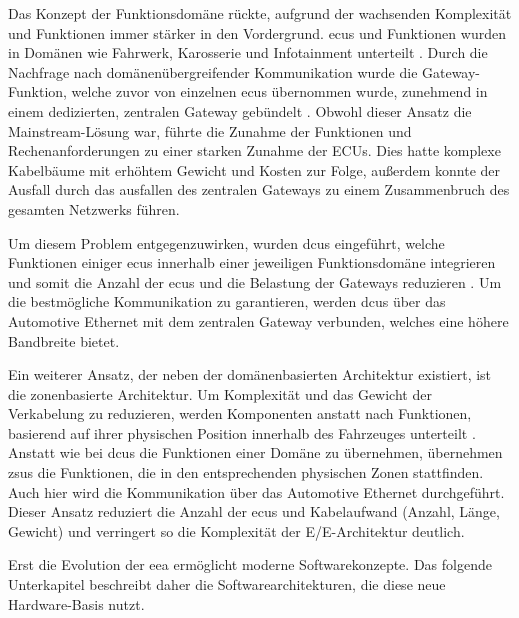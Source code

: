 Das Konzept der Funktionsdomäne rückte, aufgrund der wachsenden Komplexität und Funktionen immer stärker in den Vordergrund. \glspl{ecu} und Funktionen wurden in Domänen wie Fahrwerk, Karosserie und Infotainment unterteilt \cite{jiang2019vehicle}. Durch die Nachfrage nach domänenübergreifender Kommunikation wurde die Gateway-Funktion, welche zuvor von einzelnen \glspl{ecu} übernommen wurde, zunehmend in einem dedizierten, zentralen Gateway gebündelt \cite{jiang2019vehicle}\cite{zhuRequirementsDrivenAutomotiveElectrical2021}.
Obwohl dieser Ansatz die Mainstream-Lösung war, führte die Zunahme der Funktionen und Rechenanforderungen zu einer starken Zunahme der ECUs. Dies hatte komplexe Kabelbäume mit erhöhtem Gewicht und Kosten zur Folge, außerdem konnte der Ausfall durch das ausfallen des zentralen Gateways zu einem Zusammenbruch des gesamten Netzwerks führen.

Um diesem Problem entgegenzuwirken, wurden \glspl{dcu} eingeführt, welche Funktionen einiger \glspl{ecu} innerhalb einer jeweiligen Funktionsdomäne integrieren und somit die Anzahl der \glspl{ecu} und die Belastung der Gateways reduzieren \cite{bandur2021making}\cite{jiang2019vehicle}\cite{wang2024review}. Um die bestmögliche Kommunikation zu garantieren, werden \glspl{dcu} über das Automotive Ethernet mit dem zentralen Gateway verbunden, welches eine höhere Bandbreite bietet.

Ein weiterer Ansatz, der neben der domänenbasierten Architektur existiert, ist die zonenbasierte Architektur. Um Komplexität und das Gewicht der Verkabelung zu reduzieren, werden Komponenten anstatt nach Funktionen, basierend auf ihrer physischen Position innerhalb des Fahrzeuges unterteilt \cite{wang2024review}\cite{jiang2019vehicle}. Anstatt wie bei \glspl{dcu} die Funktionen einer Domäne zu übernehmen, übernehmen \glspl{zsu} die Funktionen, die in den entsprechenden physischen Zonen stattfinden. Auch hier wird die Kommunikation über das Automotive Ethernet durchgeführt. Dieser Ansatz reduziert die Anzahl der \glspl{ecu} und Kabelaufwand (Anzahl, Länge, Gewicht) und verringert so die Komplexität der E/E-Architektur deutlich.

Erst die Evolution der \gls{eea} ermöglicht moderne Softwarekonzepte. Das folgende Unterkapitel beschreibt daher die Softwarearchitekturen, die diese neue Hardware-Basis nutzt.

